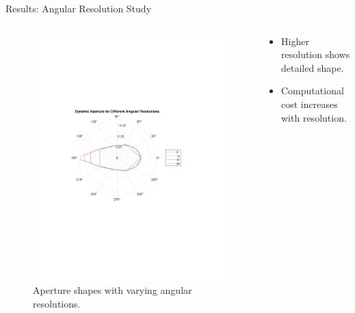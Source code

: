 \documentclass{beamer}
\begin{document}
\begin{frame}{Results: Angular Resolution Study}
\begin{columns}
\begin{column}{0.5\textwidth}
    \begin{figure}
        \centering
        \includegraphics[width=1\linewidth]{sc_da_vs_cntangle.pdf}
        \caption{Aperture shapes with varying angular resolutions.}
    \end{figure}
\end{column}
\begin{column}{0.5\textwidth}
    \begin{itemize}
        \item Higher resolution shows detailed shape.
        \item Computational cost increases with resolution.
    \end{itemize}
\end{column}
\end{columns}
\end{frame}
\end{document}
